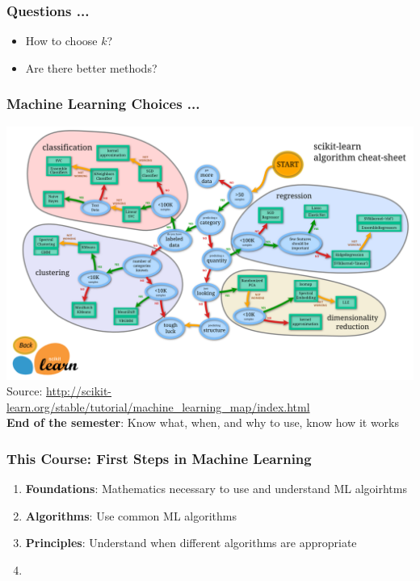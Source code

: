 \documentclass{beamer}
\begin{document}
\begin{frame}\frametitle{Questions ...}
\begin{itemize}
    \item How to choose $k$?
    \item Are there better methods?
\end{itemize}
\end{frame}

\begin{frame} \frametitle{Machine Learning Choices ...}
    \centering
    \includegraphics[width=\linewidth]{../figs/class1/ml_map.png}\\
    {\tiny Source: \url{http://scikit-learn.org/stable/tutorial/machine_learning_map/index.html}} \\[3mm]
    \textbf{End of the semester}: Know what, when, and why to use, know how it works
\end{frame}

\begin{frame}\frametitle{This Course: First Steps in Machine Learning}
\begin{enumerate}
\item \textbf{Foundations}: Mathematics necessary to use and understand ML algoirhtms
\vfill
\item \textbf{Algorithms}: Use common ML algorithms
\vfill
\item \textbf{Principles}: Understand when different algorithms are appropriate
  \vfill
\item 
\end{enumerate}
\end{frame}
\end{document}
